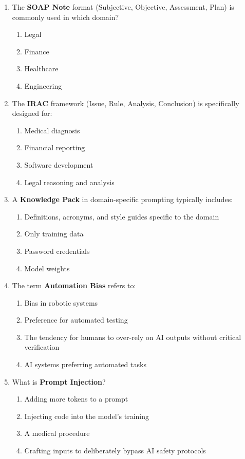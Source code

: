 \documentclass[11pt]{article}
\begin{document}
\begin{enumerate}
\item The \textbf{SOAP Note} format (Subjective, Objective, Assessment, Plan) is commonly used in which domain?
\begin{enumerate}[label=\Alph*)]
    \item Legal
    \item Finance
    \item Healthcare
    \item Engineering
\end{enumerate}

\item The \textbf{IRAC} framework (Issue, Rule, Analysis, Conclusion) is specifically designed for:
\begin{enumerate}[label=\Alph*)]
    \item Medical diagnosis
    \item Financial reporting
    \item Software development
    \item Legal reasoning and analysis
\end{enumerate}

\item A \textbf{Knowledge Pack} in domain-specific prompting typically includes:
\begin{enumerate}[label=\Alph*)]
    \item Definitions, acronyms, and style guides specific to the domain
    \item Only training data
    \item Password credentials
    \item Model weights
\end{enumerate}

\item The term \textbf{Automation Bias} refers to:
\begin{enumerate}[label=\Alph*)]
    \item Bias in robotic systems
    \item Preference for automated testing
    \item The tendency for humans to over-rely on AI outputs without critical verification
    \item AI systems preferring automated tasks
\end{enumerate}

\item What is \textbf{Prompt Injection}?
\begin{enumerate}[label=\Alph*)]
    \item Adding more tokens to a prompt
    \item Injecting code into the model's training
    \item A medical procedure
    \item Crafting inputs to deliberately bypass AI safety protocols
\end{enumerate}


\end{enumerate}
\end{document}
